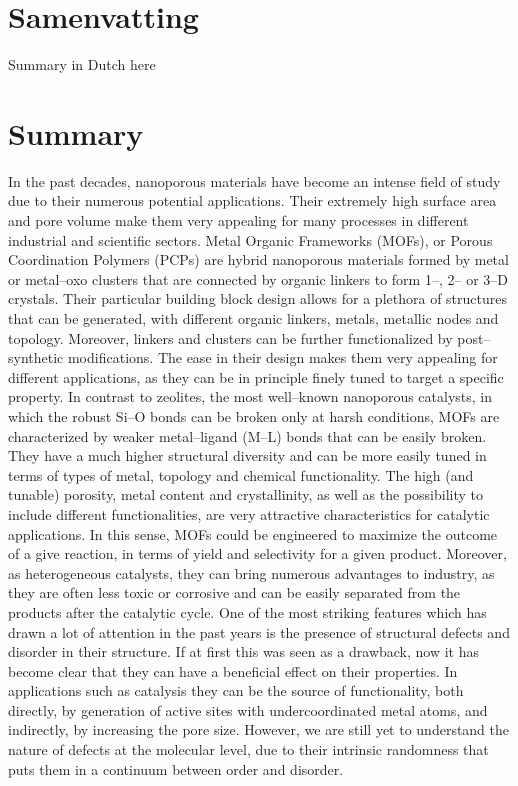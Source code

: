 \chapter{Samenvatting}
Summary in Dutch here

\chapter{Summary}
 In the past decades, nanoporous materials have become an intense field of study due to their numerous potential applications. Their extremely high surface area and pore volume make them very appealing for many processes in different industrial and scientific sectors. 
\npar
Metal Organic Frameworks (MOFs), or Porous Coordination Polymers (PCPs) are hybrid nanoporous materials formed by metal or metal--oxo clusters that are connected by organic linkers to form 1--, 2-- or 3--D crystals. Their particular building block design allows for a plethora of structures that can be generated, with different organic linkers, metals, metallic nodes and topology. Moreover, linkers and clusters can be further functionalized by post--synthetic modifications. The ease in their design makes them very appealing for different applications, as they can be in principle finely tuned to target a specific property. In contrast to zeolites, the most well--known nanoporous catalysts, in which the robust Si--O bonds can be broken only at harsh conditions, MOFs are characterized by weaker metal--ligand (M--L) bonds that can be easily broken. They have a much higher structural diversity and can be more easily tuned in terms of types of metal, topology and chemical functionality. The high (and tunable) porosity, metal content and crystallinity, as well as the possibility to include different functionalities, are very attractive characteristics for catalytic applications. In this sense, MOFs could be engineered to maximize the outcome of a give reaction, in terms of yield and selectivity for a given product. Moreover, as heterogeneous catalysts, they can bring numerous advantages to industry, as they are often less toxic or corrosive and can be easily separated from the products after the catalytic cycle. One of the most striking features which has drawn a lot of attention in the past years is the presence of structural defects and disorder in their structure. If at first this was seen as a drawback, now it has become clear that they can have a beneficial effect on their properties. In applications such as catalysis they can be the source of functionality, both directly, by generation of active sites with undercoordinated metal atoms, and indirectly, by increasing the pore size. However, we are still yet to understand the nature of defects at the molecular level, due to their intrinsic randomness that puts them in a continuum between order and disorder.
